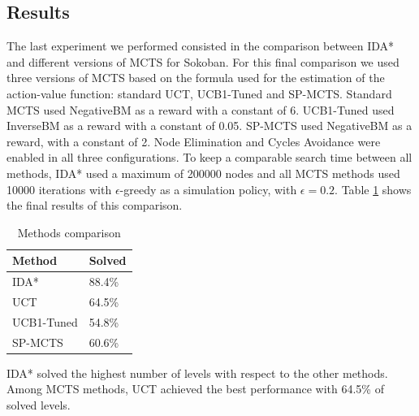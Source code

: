 \subsection{Results}
The last experiment we performed consisted in the comparison between IDA* and different versions of MCTS for Sokoban. For this final comparison we used three versions of MCTS based on the formula used for the estimation of the action-value function: standard UCT, UCB1-Tuned and SP-MCTS. Standard MCTS used NegativeBM as a reward with a constant of 6. UCB1-Tuned used InverseBM as a reward with a constant of 0.05. SP-MCTS used NegativeBM as a reward, with a constant of 2. Node Elimination and Cycles Avoidance were enabled in all three configurations. To keep a comparable search time between all methods, IDA* used a maximum of 200000 nodes and all MCTS methods used 10000 iterations with $\epsilon$-greedy as a simulation policy, with $\epsilon=0.2$. Table \ref{tab:sokoban_results} shows the final results of this comparison.
\begin{table}[!h]
    \centering
    \begin{tabular}{l|l}
        Method & Solved \\
        \hline
        IDA* & 88.4\%\\ 
        UCT & 64.5\%\\
        UCB1-Tuned & 54.8\%\\
        SP-MCTS & 60.6\%\\
    \end{tabular}
    \caption{Methods comparison}
    \label{tab:sokoban_results}
\end{table}
\clearpage
\medskip\noindent
IDA* solved the highest number of levels with respect to the other methods. Among MCTS methods, UCT achieved the best performance with 64.5\% of solved levels.